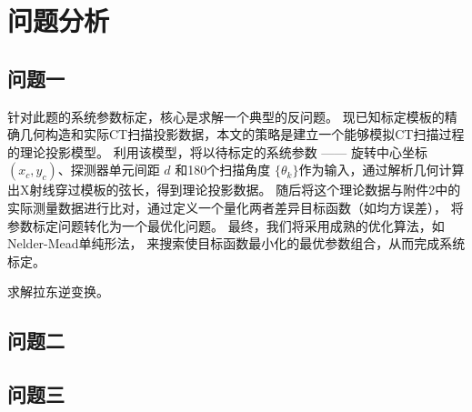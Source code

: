 \section{问题分析}
\subsection{问题一}
针对此题的系统参数标定，核心是求解一个典型的反问题。
现已知标定模板的精确几何构造和实际CT扫描投影数据，本文的策略是建立一个能够模拟CT扫描过程的理论投影模型。
利用该模型，将以待标定的系统参数 —— 旋转中心坐标 $(x_c, y_c)$、探测器单元间距 $d$ 
和180个扫描角度 $\{\theta_k\}$作为输入，通过解析几何计算出X射线穿过模板的弦长，得到理论投影数据。
随后将这个理论数据与附件2中的实际测量数据进行比对，通过定义一个量化两者差异目标函数（如均方误差），
将参数标定问题转化为一个最优化问题。
最终，我们将采用成熟的优化算法，如Nelder-Mead单纯形法，
来搜索使目标函数最小化的最优参数组合，从而完成系统标定。

求解拉东逆变换。

\subsection{问题二}


\subsection{问题三}

